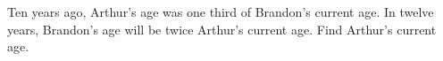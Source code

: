 Ten years ago, Arthur's age was one third of Brandon's current age. In twelve years, Brandon's age will be twice Arthur's current age. Find Arthur's current age.
